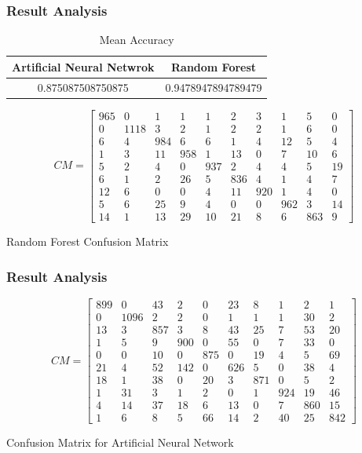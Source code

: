 \documentclass{beamer}
\begin{document}
\begin{frame}
\frametitle{Result Analysis}
\begin{center}
\begin{table}
\caption{Mean Accuracy}
\begin{tabular}{ || c c || } 
\hline
Artificial Neural Netwrok & Random Forest\\
\hline
0.875087508750875 & 0.9478947894789479\\
 \hline
\end{tabular}
\end{table}
\end{center}

\[
CM=
  \begin{bmatrix}
   965  &  0 &   1   & 1   & 1  &  2  &  3  &  1  &  5  &  0\\
0 & 1118  &  3  &  2  &  1   & 2  &  2  &  1 &   6 &   0\\
6  &  4 & 984 &   6  &  6  &  1  &  4 &  12  &  5  &  4\\
1  &  3  &  11  &  958  &  1  &  13  &  0  &  7 &   10  &   6\\
5  &   2 &   4  &  0 &  937 &   2 &   4  &  4 &   5 &  19\\
6   &  1  &   2  &  26  &  5  &  836  &  4   &  1  &   4 &   7\\
12  &  6  &  0 &   0  &  4 &  11 &  920  &   1  &  4  &  0\\
5   &  6 &  25  &   9  &  4  &  0  &  0 & 962  &  3 &  14\\
14  &  1 &  13 &  29 &  10 &  21 &   8 &   6 & 863 &    9
  \end{bmatrix}
\]
\centerline{Random Forest Confusion Matrix}

\end{frame}

\begin{frame}
\frametitle{Result Analysis}
\[
CM=
  \begin{bmatrix}
899  &  0  & 43  &  2  &  0 &  23  &  8  &  1  &  2  &  1\\
0 & 1096  &  2 &   2  &  0  &  1 &   1  &  1 &  30  &  2\\
13  &  3 & 857  &  3  &  8  & 43  & 25 &   7 &  53 &  20\\
1 &   5  &  9 & 900  &  0  & 55  &  0 &   7 &  33 &   0\\
0  &  0 &  10 &   0 & 875  &  0  & 19  &  4 &   5 &  69\\
21  &  4  & 52 & 142  &  0 & 626  &  5 &   0  & 38 &   4\\
18 &   1  & 38 &   0 &  20  &  3 & 871  &  0 &   5   & 2\\
1 &  31 &   3  &  1 &   2 &   0  &  1 & 924 &  19 &  46\\
4 &  14 &  37 &  18  &  6 &  13  &  0  &  7 & 860 &  15\\
1  &  6 &   8  &  5  &  66 &  14 &   2 &  40 &  25 & 842
  \end{bmatrix}
\]
\centerline{Confusion Matrix for Artificial Neural Network}
\end{frame}
\end{document}
